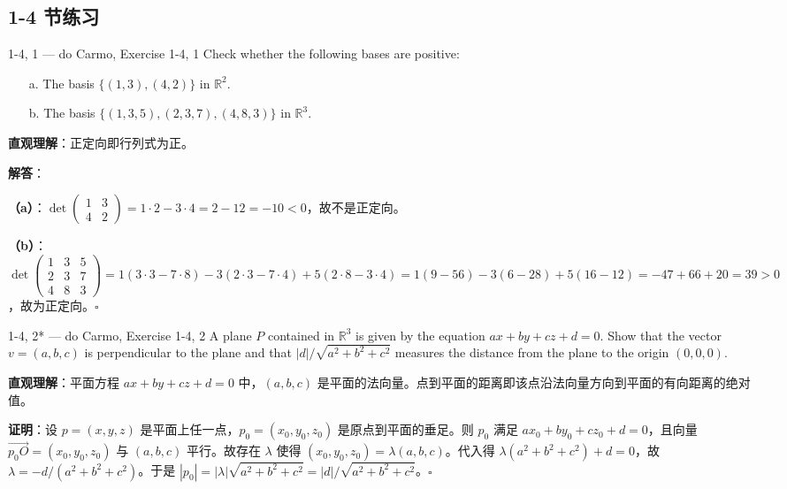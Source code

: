 \subsection*{1-4 节练习}

\begin{exercise}{1-4, 1 — do Carmo, Exercise 1-4, 1}
Check whether the following bases are positive:
\begin{enumerate}
\item[a.] The basis $\{(1,3),(4,2)\}$ in $\mathbb{R}^2$.
\item[b.] The basis $\{(1,3,5),(2,3,7),(4,8,3)\}$ in $\mathbb{R}^3$.
\end{enumerate}
\end{exercise}

\begin{solution}
\textbf{直观理解}：正定向即行列式为正。

\textbf{解答}：

\textbf{（a）}：$\det\begin{pmatrix}1&3\\4&2\end{pmatrix} = 1\cdot2 - 3\cdot4 = 2 - 12 = -10 < 0$，故不是正定向。

\textbf{（b）}：$\det\begin{pmatrix}1&3&5\\2&3&7\\4&8&3\end{pmatrix} = 1(3\cdot3-7\cdot8) - 3(2\cdot3-7\cdot4) + 5(2\cdot8-3\cdot4) = 1(9-56) - 3(6-28) + 5(16-12) = -47 + 66 + 20 = 39 > 0$，故为正定向。$\square$
\end{solution}

\begin{exercise}{1-4, 2* — do Carmo, Exercise 1-4, 2}
A plane $P$ contained in $\mathbb{R}^3$ is given by the equation $ax + by + cz + d = 0$. Show that the vector $v = (a, b, c)$ is perpendicular to the plane and that $|d| / \sqrt{a^2 + b^2 + c^2}$ measures the distance from the plane to the origin $(0, 0, 0)$.
\end{exercise}

\begin{solution}
\textbf{直观理解}：平面方程 $ax+by+cz+d=0$ 中，$(a,b,c)$ 是平面的法向量。点到平面的距离即该点沿法向量方向到平面的有向距离的绝对值。

\textbf{证明}：设 $p = (x,y,z)$ 是平面上任一点，$p_0 = (x_0,y_0,z_0)$ 是原点到平面的垂足。则 $p_0$ 满足 $ax_0+by_0+cz_0+d=0$，且向量 $\overrightarrow{p_0O} = (x_0,y_0,z_0)$ 与 $(a,b,c)$ 平行。故存在 $\lambda$ 使得 $(x_0,y_0,z_0) = \lambda(a,b,c)$。代入得 $\lambda(a^2+b^2+c^2) + d = 0$，故 $\lambda = -d/(a^2+b^2+c^2)$。于是 $|p_0| = |\lambda|\sqrt{a^2+b^2+c^2} = |d|/\sqrt{a^2+b^2+c^2}$。$\square$
\end{solution}

